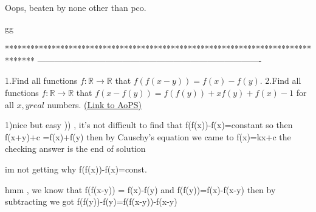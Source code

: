 \begin{solution}
	Oops, beaten by none other than pco.

gg
\end{solution}
*******************************************************************************
-------------------------------------------------------------------------------

\begin{problem}
	1.Find all functions $f:\mathbb{R} \rightarrow \mathbb{R} $ that 
$f(f(x-y))=f(x)-f(y)$.
2.Find all functions $f:\mathbb{R} \rightarrow \mathbb{R} $ that 
$f(x-f(y))=f(f(y))+xf(y)+f(x)-1$ for all $x,y real$ numbers.
	\flushright \href{https://artofproblemsolving.com/community/c6h572121}{(Link to AoPS)}
\end{problem}



\begin{solution}
	1)nice but  easy )) , it's not difficult to find that f(f(x))-f(x)=constant so then f(x+y)+c =f(x)+f(y) then by Causchy's equation we came to 
f(x)=kx+c the checking answer is the end of solution
\end{solution}



\begin{solution}
	im not getting why f(f(x))-f(x)=const.
\end{solution}



\begin{solution}
	hmm , we know that f(f(x-y)) = f(x)-f(y) and f(f(y))=f(x)-f(x-y) then by subtracting we got f(f(y))-f(y)=f(f(x-y))-f(x-y)
\end{solution}



